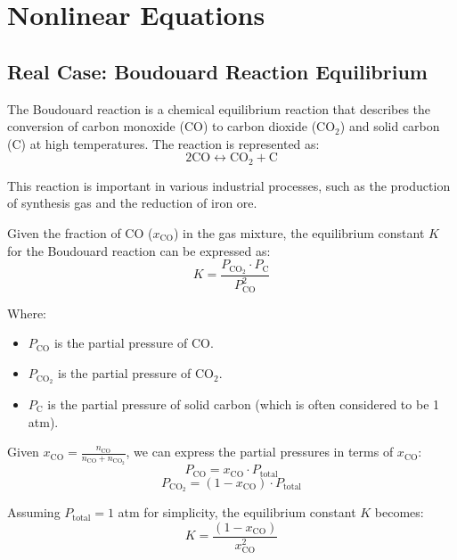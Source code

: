 \documentclass[10pt]{article}
\begin{document}
\section{Nonlinear Equations}
\subsection{Real Case: Boudouard Reaction Equilibrium}

The Boudouard reaction is a chemical equilibrium reaction that describes the conversion of carbon monoxide (\(\text{CO}\)) to carbon dioxide (\(\text{CO}_2\)) and solid carbon (C) at high temperatures. The reaction is represented as:
\begin{equation}
2 \text{CO} \leftrightarrow \text{CO}_2 + \text{C}
\end{equation}

This reaction is important in various industrial processes, such as the production of synthesis gas and the reduction of iron ore.

Given the fraction of CO (\( x_{\text{CO}} \)) in the gas mixture, the equilibrium constant \( K \) for the Boudouard reaction can be expressed as:
\begin{equation}
K = \frac{P_{\text{CO}_2} \cdot P_{\text{C}}}{P_{\text{CO}}^2}
\end{equation}

Where:
\begin{itemize}
    \item \( P_{\text{CO}} \) is the partial pressure of \(\text{CO}\).
    \item \( P_{\text{CO}_2} \) is the partial pressure of \(\text{CO}_2\).
    \item \( P_{\text{C}} \) is the partial pressure of solid carbon (which is often considered to be 1 atm).
\end{itemize}

Given \( x_{\text{CO}} = \frac{n_{\text{CO}}}{n_{\text{CO}} + n_{\text{CO}_2}} \), we can express the partial pressures in terms of \( x_{\text{CO}} \):
\begin{equation}
P_{\text{CO}} = x_{\text{CO}} \cdot P_{\text{total}}
\end{equation}
\begin{equation}
P_{\text{CO}_2} = (1 - x_{\text{CO}}) \cdot P_{\text{total}}
\end{equation}

Assuming \( P_{\text{total}} = 1 \) atm for simplicity, the equilibrium constant \( K \) becomes:
\begin{equation}
K = \frac{(1 - x_{\text{CO}})}{x_{\text{CO}}^2}
\end{equation}
\end{document}
